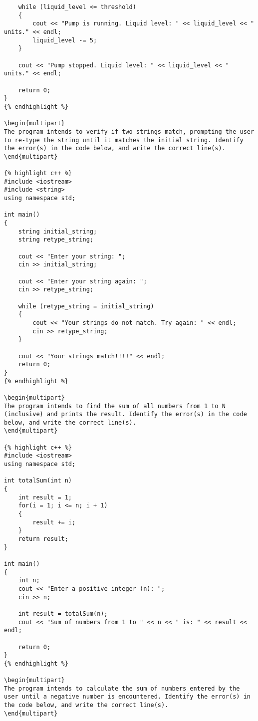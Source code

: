 {{{{{{{{{{\begin{problem}
\begin{verbatim}
    while (liquid_level <= threshold)
    {
        cout << "Pump is running. Liquid level: " << liquid_level << " units." << endl;
        liquid_level -= 5;
    }

    cout << "Pump stopped. Liquid level: " << liquid_level << " units." << endl;

    return 0;
}
{% endhighlight %}

\begin{multipart}
The program intends to verify if two strings match, prompting the user to re-type the string until it matches the initial string. Identify the error(s) in the code below, and write the correct line(s).
\end{multipart}

{% highlight c++ %}
#include <iostream>
#include <string>
using namespace std;

int main() 
{
    string initial_string;
    string retype_string;

    cout << "Enter your string: ";
    cin >> initial_string;

    cout << "Enter your string again: ";
    cin >> retype_string;

    while (retype_string = initial_string) 
    {
        cout << "Your strings do not match. Try again: " << endl;
        cin >> retype_string;
    }

    cout << "Your strings match!!!!" << endl;
    return 0;
}
{% endhighlight %}

\begin{multipart}
The program intends to find the sum of all numbers from 1 to N (inclusive) and prints the result. Identify the error(s) in the code below, and write the correct line(s).
\end{multipart}

{% highlight c++ %}
#include <iostream>
using namespace std;

int totalSum(int n)
{
    int result = 1;
    for(i = 1; i <= n; i + 1)
    {
        result += i;
    }
    return result;
}

int main() 
{
    int n;
    cout << "Enter a positive integer (n): ";
    cin >> n;

    int result = totalSum(n);
    cout << "Sum of numbers from 1 to " << n << " is: " << result << endl;

    return 0;
}
{% endhighlight %}

\begin{multipart}
The program intends to calculate the sum of numbers entered by the user until a negative number is encountered. Identify the error(s) in the code below, and write the correct line(s).
\end{multipart}


\end{verbatim}
\end{problem}}}}}}}}}}}
